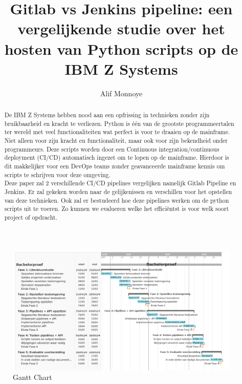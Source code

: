 \documentclass{hogent-article}
\title{Gitlab vs Jenkins pipeline: een vergelijkende studie over het hosten van Python scripts op de IBM Z Systems}
\author{Alif Monnoye}
\begin{document}
\begin{abstract}
  De IBM Z Systems hebben nood aan een opfrissing in technieken zonder zijn bruikbaarheid en kracht te verliezen. Python is één van de grootste programmeertalen ter wereld met veel functionaliteiten wat perfect is voor te draaien op de mainframe. Niet alleen voor zijn kracht en functionaliteit, maar ook voor zijn bekendheid onder programmeurs. Deze scripts worden door een Continuous integration/continuous deployment (CI/CD) automatisch ingezet om te lopen op de mainframe. Hierdoor is dit makkelijker voor een DevOps teams zonder geavanceerde mainframe kennis om scripts te schrijven voor deze omgeving.   \\
  Deze paper zal 2 verschillende CI/CD pipelines vergelijken namelijk Gitlab Pipeline en Jenkins. Er zal gekeken worden naar de gelijkenissen en verschillen voor het opstellen van deze technieken. Ook zal er bestudeerd hoe deze pipelines werken om de python scripts uit te voeren. Zo kunnen we evalueren welke het efficiëntst is voor welk soort project of opdracht.
\end{abstract}

\tableofcontents



\printbibliography[heading=bibintoc]

\cleardoublepage
\begin{figure}[pt!]
    \centering
    \includegraphics[width=550pt]{GanttChart.png}
    \caption{Gantt Chart}
    \label{fig}
\end{figure}
\end{document}
